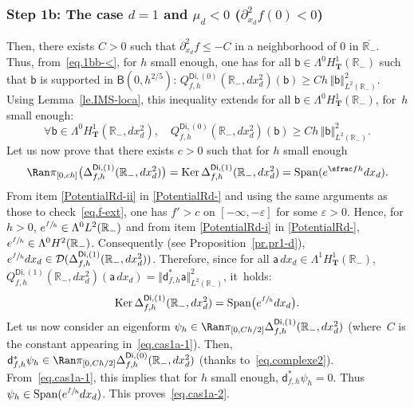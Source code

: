 \documentclass[10pt]{amsart}
\DeclareMathOperator{\Span}{Span}
\newcommand{\mbf}[1]{\mathbf{#1}}
\let\ve\varepsilon
\DeclareMathOperator\Ker{Ker}
\theoremstyle{plain}
\theoremstyle{definition}
\begin{document}
\subsubsection*{Step 1b: The case $d=1$ and $\mu_{d}<0$ (\ie $ \partial_{x_d}^2 f(0)<0$)}
Then, there exists $C>0$ such that $\partial_{x_d}^2 f\le -C$ in a neighborhood of $0$ in $\overline{\mathbb R_-}$. Thus, from~\eqref{eq.1bb-<}, for $h$ small enough, one has for all $\mathsf b\in \Lambda^0 H^1_{\mbf T}(\mathbb R_-)$ such that $\mathsf b$ is supported in $\mathsf B(0,h^{2/5 })$: $
Q_{f,h}^{\mathsf{Di},(0)}(\mathbb R_-, dx_d^2)(\mathsf b)\ge C h\, \Vert \mathsf b \Vert_{L^2(\mathbb R_-)}^2$.
Using Lemma~\ref{le.IMS-loca}, this inequality extends for all $\mathsf b\in \Lambda^0 H^1_{\mbf T}(\mathbb R_-)$, \ie for~$h$ small enough:
\begin{equation}\label{eq.cas1a-1}
\forall \mathsf b\in \Lambda^0 H^1_{\mbf T}(\mathbb R_-, dx_d^2),\quad Q_{f,h}^{\mathsf{Di},(0)}(\mathbb R_-, dx_d^2)(\mathsf b)\ge Ch\, \Vert \mathsf b \Vert_{L^2(\mathbb R_-)}^2.
\end{equation}
Let us now prove that there exists $c>0$ such that for $h$ small enough
\begin{equation}\label{eq.cas1a-2}
\Ran \pi_{[0,ch]}\bigl(\Delta_{f,h}^{\mathsf{Di},(1)}(\mathbb R_-, dx_d^2)\bigr)=\Ker \Delta_{f,h}^{\mathsf{Di},(1)}(\mathbb R_-, dx_d^2) = \Span (e^{\sfrac fh}dx_d).
\end{equation}
From item \eqref{PotentialRd-ii} in \ref{PotentialRd-} and using the same
arguments as those to check~\eqref{eq.f-ext}, one has $f'>c$ on $[-\infty, -\ve]$ for some $\ve>0$. Hence, for $h>0$, $e^{\sfrac fh}\in \Lambda^0L^2(\mathbb R_-)$ and from item \eqref{PotentialRd-i} in \ref{PotentialRd-}, $e^{\sfrac fh}\in \Lambda^0H^2(\mathbb R_-)$. Consequently (see Proposition~\ref{pr.pr1-d}), $e^{\sfrac fh}dx_d\in \mathcal D(\Delta_{f,h}^{\mathsf{Di},(1)}(\mathbb R_-, dx_d^2))$.
Therefore, since for all $\mathsf a \, dx_d\in \Lambda^1 H^1_{\mbf T}(\mathbb R_-)$, $Q_{f,h}^{\mathsf{Di},(1)}(\mathbb R_-, dx_d^2)(\mathsf a \, dx_d)= \Vert \mathsf d^*_{f,h} \mathsf a \Vert_{L^2(\mathbb R_-)}^2$, it~holds:
\[
\Ker \Delta_{f,h}^{\mathsf{Di},(1)}(\mathbb R_-,dx_d^2) = \Span \bigl(e^{\sfrac fh}dx_d\bigr).
\]
Let us now consider an eigenform $\psi_h\in \Ran \pi_{[0,Ch/2]}
\Delta_{f,h}^{\mathsf{Di},(1)}(\mathbb R _-,dx_d^2) $ (where~$C$
is the constant appearing in~\eqref{eq.cas1a-1}). Then, $\mathsf
d_{f,h}^* \psi_h \in \Ran \pi_{[0,Ch/2]}
\Delta_{f,h}^{\mathsf{Di},(0)}(\mathbb R_-,dx_d^2) $ (thanks
to~\eqref{eq.complexe2}). From~\eqref{eq.cas1a-1}, this implies that
for $h$ small enough, $\mathsf d^*_{f,h} \psi_h=0$. Thus $\psi_h\in
\Span (e^{\sfrac fh} dx_d)$. This proves~\eqref{eq.cas1a-2}.
\end{document}
